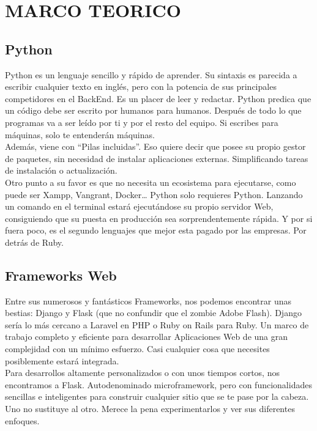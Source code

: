 \section{MARCO TEORICO} 


\subsection{Python}
	
Python es un lenguaje sencillo y rápido de aprender. Su sintaxis es parecida a escribir cualquier texto en inglés, pero con la potencia de sus principales competidores en el BackEnd.
Es un placer de leer y redactar. Python predica que un código debe ser escrito por humanos para humanos. Después de todo lo que programas va a ser leído por ti y por el resto del equipo. Si escribes para máquinas, solo te entenderán máquinas.
\\
Además, viene con “Pilas incluidas”. Eso quiere decir que posee su propio gestor de paquetes, sin necesidad de instalar aplicaciones externas. Simplificando tareas de instalación o actualización.
\\
Otro punto a su favor es que no necesita un ecosistema para ejecutarse, como puede ser Xampp, Vangrant, Docker… Python solo requieres Python. Lanzando un comando en el terminal estará ejecutándose su propio servidor Web, consiguiendo que su puesta en producción sea sorprendentemente rápida.
Y por si fuera poco, es el segundo lenguajes que mejor esta pagado por las empresas. Por detrás de Ruby.

		
\subsection{Frameworks Web}

Entre sus numerosos y fantásticos Frameworks, nos podemos encontrar unas bestias: Django y Flask (que no confundir que el zombie Adobe Flash).
Django sería lo más cercano a Laravel en PHP o Ruby on Rails para Ruby. Un marco de trabajo completo y eficiente para desarrollar Aplicaciones Web de una gran complejidad con un mínimo esfuerzo. Casi cualquier cosa que necesites posiblemente estará integrada.
\\
Para desarrollos altamente personalizados o con unos tiempos cortos, nos encontramos a Flask. Autodenominado microframework, pero con funcionalidades sencillas e inteligentes para construir cualquier sitio que se te pase por la cabeza.
Uno no sustituye al otro. Merece la pena experimentarlos y ver sus diferentes enfoques. 



